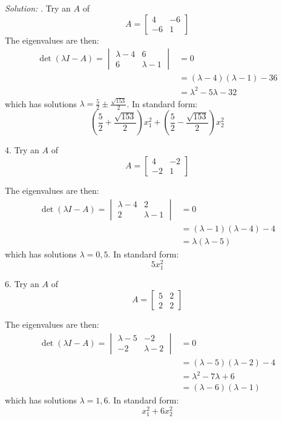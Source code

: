 \documentclass[11pt]{homework}
\begin{document}
\emph{Solution:}
.
Try an $A$ of
\begin{equation*}
A = 
  \begin{bmatrix}
  4 & -6 \\
  -6 & 1
  \end{bmatrix}
\end{equation*}
The eigenvalues are then:
\begin{align*}
\det(\lambda I -A) = 
  \begin{vmatrix}
  \lambda-4 & 6 \\
  6 & \lambda-1
  \end{vmatrix}
  &= 0 \\
  &= (\lambda -4)(\lambda -1) -36\\
  &= \lambda^2 - 5\lambda -32
\end{align*}
which has solutions $\lambda =\frac{5}{2} \pm \frac{\sqrt{153}}{2}$.
In standard form:
\begin{equation*}
  \left(\frac{5}{2} +\frac{\sqrt{153}}{2}\right)x_1^2 + \left(\frac{5}{2} -\frac{\sqrt{153}}{2}\right)x_2^2
\end{equation*}

4. 
Try an $A$ of
\begin{equation*}
A = 
  \begin{bmatrix}
  4 & -2 \\
  -2 & 1
  \end{bmatrix}
\end{equation*}

The eigenvalues are then:
\begin{align*}
\det(\lambda I -A) = 
  \begin{vmatrix}
  \lambda-4 & 2 \\
  2 & \lambda-1 
  \end{vmatrix}
  &= 0 \\
  &= (\lambda-1)(\lambda-4)-4 \\
  &= \lambda(\lambda -5)
\end{align*}
which has solutions $\lambda=0,5$.
In standard form:
\begin{equation*}
  5 x_1^2
\end{equation*}

6.
Try an $A$ of
\begin{equation*}
A = 
  \begin{bmatrix}
  5 & 2 \\
  2 & 2
  \end{bmatrix}
\end{equation*}

The eigenvalues are then:
\begin{align*}
\det(\lambda I -A) = 
  \begin{vmatrix}
  \lambda-5 & -2 \\
  -2 & \lambda-2
  \end{vmatrix}
  &= 0 \\
  &= (\lambda-5)(\lambda-2) -4 \\
  &= \lambda^2 - 7 \lambda +6 \\
  &= (\lambda-6)(\lambda-1)
\end{align*}
which has solutions $\lambda=1,6$.
In standard form:
\begin{equation*}
 x_1^2 + 6 x_2^2
\end{equation*}
\end{document}
